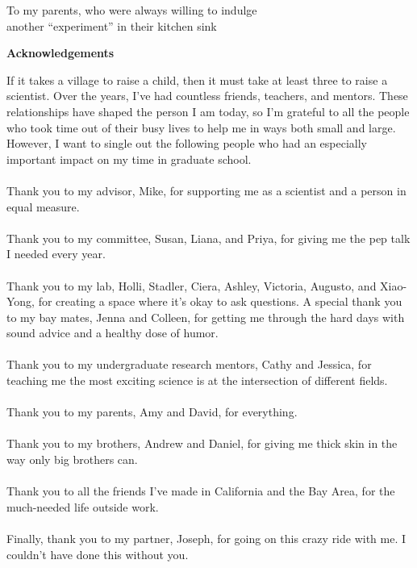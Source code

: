 \documentclass[11pt,letterpaper,oneside]{book}
\begin{document}
\setcounter{page}{1}  %

\null  %
\vfill
\begin{center}
    To my parents, who were always willing to indulge\\
    another ``experiment'' in their kitchen sink
\end{center}
\vfill
\clearpage

\begin{center}
    \bfseries\Large Acknowledgements
\end{center}
\bigskip
If it takes a village to raise a child, then it must take at least three to raise a scientist. Over the years, I've had countless friends, teachers, and mentors. These relationships have shaped the person I am today, so I'm grateful to all the people who took time out of their busy lives to help me in ways both small and large. However, I want to single out the following people who had an especially important impact on my time in graduate school.\\\\
Thank you to my advisor, Mike, for supporting me as a scientist and a person in equal measure.\\\\
Thank you to my committee, Susan, Liana, and Priya, for giving me the pep talk I needed every year.\\\\
Thank you to my lab, Holli, Stadler, Ciera, Ashley, Victoria, Augusto, and Xiao-Yong, for creating a space where it's okay to ask questions. A special thank you to my bay mates, Jenna and Colleen, for getting me through the hard days with sound advice and a healthy dose of humor.\\\\
Thank you to my undergraduate research mentors, Cathy and Jessica, for teaching me the most exciting science is at the intersection of different fields.\\\\
Thank you to my parents, Amy and David, for everything.\\\\
Thank you to my brothers, Andrew and Daniel, for giving me thick skin in the way only big brothers can.\\\\
Thank you to all the friends I've made in California and the Bay Area, for the much-needed life outside work.\\\\
Finally, thank you to my partner, Joseph, for going on this crazy ride with me. I couldn't have done this without you.
\clearpage
\end{document}
